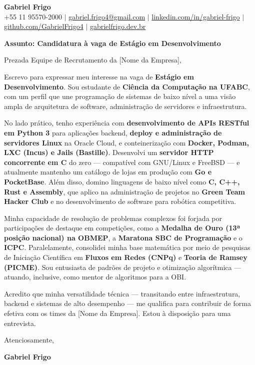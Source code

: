 \documentclass[letterpaper,10pt]{article}
\newcommand{\targetRole}{Estágio em Desenvolvimento}
\newcommand{\targetCompany}{[Nome da Empresa]}
\begin{document}
\begin{center}
  \textbf{\Huge Gabriel Frigo} \\ \vspace{5pt}
  \small +55 11 95570-2000 $|$ \href{mailto:gabriel.frigo4@gmail.com}{gabriel.frigo4@gmail.com} $|$
  \href{https://linkedin.com/in/gabriel-frigo-b6727b275/}{linkedin.com/in/gabriel-frigo} $|$
  \href{https://github.com/GabrielFrigo4}{github.com/GabrielFrigo4} $|$
  \href{https://gabrielfrigo.dev.br}{gabrielfrigo.dev.br}
\end{center}

\vspace{10pt}

\textbf{Assunto: Candidatura à vaga de \targetRole}

Prezada Equipe de Recrutamento da \targetCompany,

Escrevo para expressar meu interesse na vaga de \textbf{\targetRole}. Sou estudante de \textbf{Ciência da Computação na UFABC}, com um perfil que une programação de sistemas de baixo nível a uma visão ampla de arquitetura de software, administração de servidores e infraestrutura.

No lado prático, tenho experiência com \textbf{desenvolvimento de APIs RESTful em Python 3} para aplicações backend, \textbf{deploy e administração de servidores Linux} na Oracle Cloud, e conteinerização com \textbf{Docker, Podman, LXC (Incus) e Jails (Bastille)}. Desenvolvi um \textbf{servidor HTTP concorrente em C} do zero — compatível com GNU/Linux e FreeBSD — e atualmente mantenho um catálogo de lojas em produção com \textbf{Go e PocketBase}. Além disso, domino linguagens de baixo nível como \textbf{C, C++, Rust e Assembly}, que aplico na administração de projetos no \textbf{Green Team Hacker Club} e no desenvolvimento de software para robótica competitiva.

Minha capacidade de resolução de problemas complexos foi forjada por participações de destaque em competições, como a \textbf{Medalha de Ouro (13ª posição nacional) na OBMEP}, a \textbf{Maratona SBC de Programação} e o \textbf{ICPC}. Paralelamente, consolidei minha base matemática por meio de pesquisas de Iniciação Científica em \textbf{Fluxos em Redes (CNPq)} e \textbf{Teoria de Ramsey (PICME)}. Sou entusiasta de padrões de projeto e otimização algorítmica --- atuando, inclusive, como mentor de algoritmos para a OBI.

Acredito que minha versatilidade técnica — transitando entre infraestrutura, backend e sistemas de alto desempenho — me qualifica para contribuir de forma efetiva com os times da \targetCompany. Estou à disposição para uma entrevista.

Atenciosamente,

\textbf{Gabriel Frigo}
\end{document}
